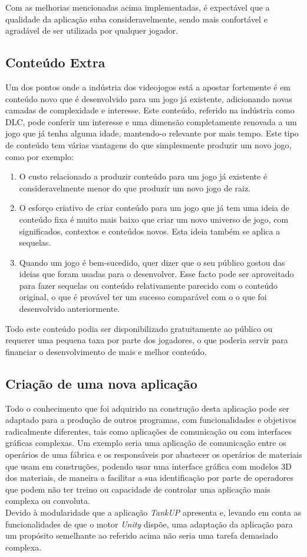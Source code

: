 Com as melhorias mencionadas acima implementadas, é expectável que a qualidade da aplicação suba consideravelmente, sendo mais confortável e agradável de ser utilizada por qualquer jogador.

\subsection{Conteúdo Extra}
\label{chap7:subsec:CE}
Um dos pontos onde a indústria dos videojogos está a apostar fortemente é em conteúdo novo que é desenvolvido para um jogo já existente, adicionando novas camadas de complexidade e interesse. Este conteúdo, referido na indústria como \ac{DLC}, pode conferir um interesse e uma dimensão completamente renovada a um jogo que já tenha alguma idade, mantendo-o relevante por mais tempo. 
Este tipo de conteúdo tem várias vantagens do que simplesmente produzir um novo jogo, como por exemplo:
\begin{enumerate}
    \item O custo relacionado a produzir conteúdo para um jogo já existente é consideravelmente menor do que produzir um novo jogo de raiz.
    \item O esforço criativo de criar conteúdo para um jogo que já tem uma ideia de conteúdo fixa é muito mais baixo que criar um novo universo de jogo, com significados, contextos e conteúdos novos. Esta ideia também se aplica a sequelas.
    \item Quando um jogo é bem-sucedido, quer dizer que o seu público gostou das ideias que foram usadas para o desenvolver. Esse facto pode ser aproveitado para fazer sequelas ou conteúdo relativamente parecido com  o conteúdo original, o que é provável ter um sucesso comparável com o o que foi desenvolvido anteriormente.
\end{enumerate} 

Todo este conteúdo podia ser disponibilizado gratuitamente ao público ou requerer uma pequena taxa por parte dos jogadores, o que poderia servir para financiar o desenvolvimento de mais e melhor conteúdo.

 \subsection{Criação de uma nova aplicação}
\label{chap7:subsec:CA}
Todo o conhecimento que foi adquirido na construção desta aplicação pode ser adaptado para a produção de outros programas, com funcionalidades e objetivos radicalmente diferentes, tais como aplicações de comunicação ou com interfaces gráficas complexas. Um exemplo seria uma aplicação de comunicação entre os operários de uma fábrica e os responsáveis por abastecer os operários de materiais que usam em construções, podendo usar uma interface gráfica com modelos 3D dos materiais, de maneira a facilitar a sua identificação por parte de operadores que podem não ter treino ou capacidade de controlar uma aplicação mais complexa ou convoluta. \\ 

 Devido à modularidade que a aplicação \emph{TankUP} apresenta e, levando em conta as funcionalidades de que o motor \emph{Unity} dispõe, uma adaptação da aplicação para um propósito semelhante ao referido acima não seria uma tarefa demasiado complexa.
